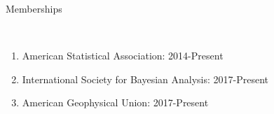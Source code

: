 \documentclass[12pt]{article}
\newcommand{\head}[1]{ %
    \bigskip %
    \begin{large}\begin{bf}{#1}\end{bf}\end{large} %

    \ \\ [-1.3cm] %

    \hrulefill}
\begin{document}
\head{Memberships}

\begin{enumerate}[label=$\bullet$]
\item American Statistical Association: 2014-Present
\item International Society for Bayesian Analysis: 2017-Present
\item American Geophysical Union: 2017-Present
\end{enumerate}



\end{document}

